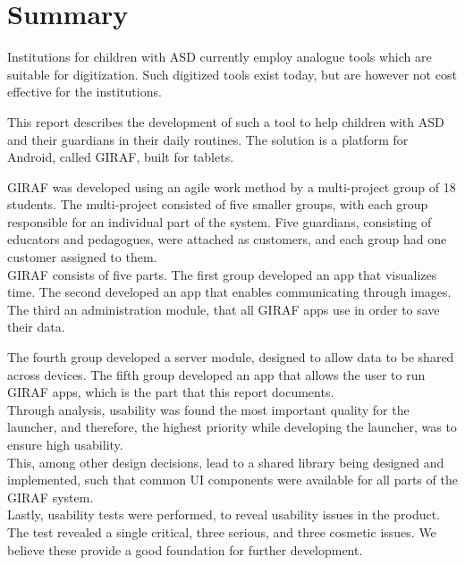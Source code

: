 
\begingroup
\let\clearpage\relax
\let\cleardoublepage\relax
\let\cleardoublepage\relax

\chapter*{Summary}
\label{report_structure}

Institutions for children with ASD currently employ analogue tools which are suitable for digitization.
Such digitized tools exist today, but are however not cost effective for the institutions. 

This report describes the development of such a tool to help children with ASD and their guardians in their daily routines.
The solution is a platform for Android, called GIRAF, built for tablets.

GIRAF was developed using an agile work method by a multi-project group of 18 students. The multi-project consisted of five smaller groups, with each group responsible for an individual part of the system.
Five guardians, consisting of educators and pedagogues, were attached as customers, and each group had one customer assigned to them. \\

GIRAF consists of five parts. The first group developed an app that visualizes time. The second developed an app that enables communicating through images.
The third an administration module, that all GIRAF apps use in order to save their data.

The fourth group developed a server module, designed to allow data to be shared across devices.
The fifth group developed an app that allows the user to run GIRAF apps, which is the part that this report documents. \\

Through analysis, usability was found the most important quality for the launcher, and therefore, the highest priority while developing the launcher, was to ensure high usability. \\

This, among other design decisions, lead to a shared library being designed and implemented, such that common UI components were available for all parts of the GIRAF system. \\

Lastly, usability tests were performed, to reveal usability issues in the product.
The test revealed a single critical, three serious, and three cosmetic issues.
We believe these provide a good foundation for further development.

\endgroup			
\vfill
